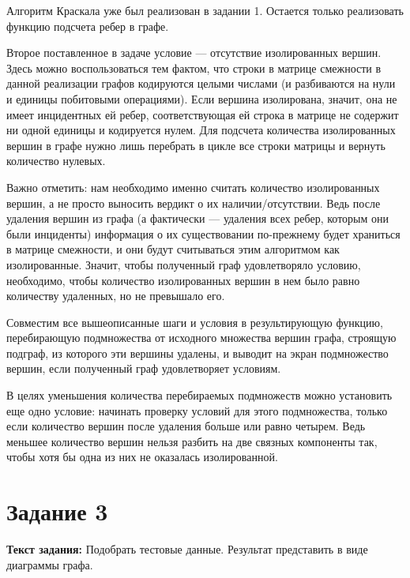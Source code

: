 \documentclass[12pt]{article}
\begin{document}
	Алгоритм Краскала уже был реализован в задании 1. Остается только реализовать функцию подсчета ребер в графе.
	
	 
	
	Второе поставленное в задаче условие --- отсутствие изолированных вершин. Здесь можно воспользоваться тем фактом, что строки в матрице смежности в данной реализации графов кодируются целыми числами (и разбиваются на нули и единицы побитовыми операциями). Если вершина изолирована, значит, она не имеет инцидентных ей ребер, соответствующая ей строка в матрице не содержит ни одной единицы и кодируется нулем. Для подсчета количества изолированных вершин в графе нужно лишь перебрать в цикле все строки матрицы и вернуть количество нулевых.
	
	Важно отметить: нам необходимо именно считать количество изолированных вершин, а не просто выносить вердикт о их наличии/отсутствии. Ведь после удаления вершин из графа (а фактически --- удаления всех ребер, которым они были инциденты) информация о их существовании по-прежнему будет храниться в матрице смежности, и они будут считываться этим алгоритмом как изолированные. Значит, чтобы полученный граф удовлетворяло условию, необходимо, чтобы количество изолированных вершин в нем было равно количеству удаленных, но не превышало его.
	
	 
	
	Совместим все вышеописанные шаги и условия в результирующую функцию, перебирающую подмножества от исходного множества вершин графа, строящую подграф, из которого эти вершины удалены, и выводит на экран подмножество вершин, если полученный граф удовлетворяет условиям. 
	
	В целях уменьшения количества перебираемых подмножеств можно установить еще одно условие: начинать проверку условий для этого подмножества, только если количество вершин после удаления больше или равно четырем. Ведь меньшее количество вершин нельзя разбить на две связных компоненты так, чтобы хотя бы одна из них не оказалась изолированной.
	
	 

	
	\section{Задание 3}
	\label{task3}

	{\bf Текст задания:} Подобрать тестовые данные. Результат представить в виде диаграммы графа. 
	
\end{document}
